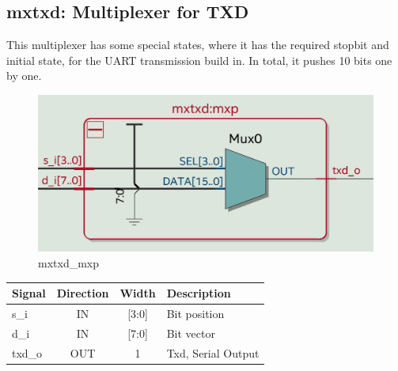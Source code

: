 \documentclass[12pt,a4 paper] {report}
\begin{document}
\newpage

\subsection{mxtxd: Multiplexer for TXD}
This multiplexer has some special states, where it has the required stopbit and initial state, for the UART transmission 
build in. In total, it pushes 10 bits one by one.
\begin{figure}[h]
	\centering	
	\includegraphics[scale=0.15]{../png/mxtxd_mxp.png}
	\caption{mxtxd\_mxp}
\end{figure}
\begin{center}
	\begin{tabular}{ | p{2cm} | c | c | p{5cm} |}
		\hline
		\textbf{Signal} & \textbf{Direction} & \textbf{Width} & \textbf{Description} \\
		\hline
		\hline
		s\_i & IN & [3:0] & Bit position \\
		\hline
		d\_i & IN & [7:0] & Bit vector \\
		\hline
		txd\_o & OUT & 1 & Txd, Serial Output \\
		\hline
	\end{tabular}
\end{center} 

\newpage
\end{document}
